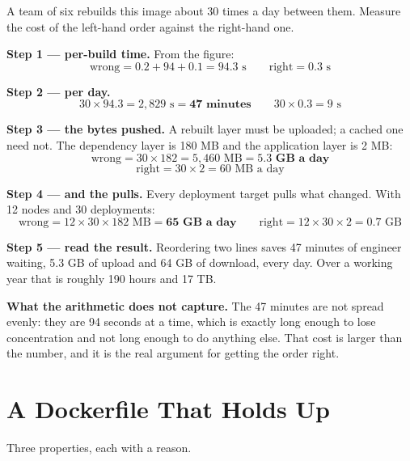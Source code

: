 \begin{worked}
A team of six rebuilds this image about 30 times a day between them. Measure
the cost of the left-hand order against the right-hand one.

\smallskip
\textbf{Step 1 --- per-build time.} From the figure:
\[ \text{wrong} = 0.2 + 94 + 0.1 = 94.3 \text{ s} \qquad
   \text{right} = 0.3 \text{ s} \]

\smallskip
\textbf{Step 2 --- per day.}
\[ 30 \times 94.3 = 2{,}829 \text{ s} = \mathbf{47 \text{ minutes}} \qquad
   30 \times 0.3 = 9 \text{ s} \]

\smallskip
\textbf{Step 3 --- the bytes pushed.} A rebuilt layer must be uploaded; a
cached one need not. The dependency layer is 180 MB and the application layer
is 2 MB:
\[ \text{wrong} = 30 \times 182 = 5{,}460 \text{ MB} = \mathbf{5.3 \text{ GB
   a day}} \]
\[ \text{right} = 30 \times 2 = 60 \text{ MB a day} \]

\smallskip
\textbf{Step 4 --- and the pulls.} Every deployment target pulls what changed.
With 12 nodes and 30 deployments:
\[ \text{wrong} = 12 \times 30 \times 182 \text{ MB} = \mathbf{65 \text{ GB a
   day}} \qquad \text{right} = 12 \times 30 \times 2 = 0.7 \text{ GB} \]

\smallskip
\textbf{Step 5 --- read the result.} Reordering two lines saves 47 minutes of
engineer waiting, 5.3 GB of upload and 64 GB of download, every day. Over a
working year that is roughly 190 hours and 17 TB.

\smallskip
\textbf{What the arithmetic does not capture.} The 47 minutes are not spread
evenly: they are 94 seconds at a time, which is exactly long enough to lose
concentration and not long enough to do anything else. That cost is larger than
the number, and it is the real argument for getting the order right.
\end{worked}

\section{A Dockerfile That Holds Up}

Three properties, each with a reason.

